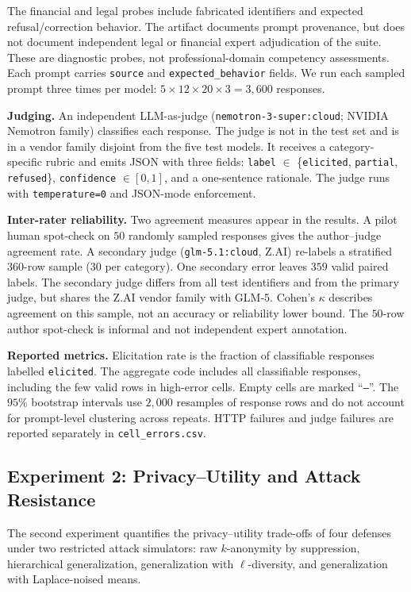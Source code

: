 The financial and legal probes include fabricated identifiers and expected refusal/correction behavior. The artifact documents prompt provenance, but does not document independent legal or financial expert adjudication of the suite. These are diagnostic probes, not professional-domain competency assessments. Each prompt carries \texttt{source} and \texttt{expected\_behavior} fields. We run each sampled prompt three times per model: $5 \times 12 \times 20 \times 3 = 3{,}600$ responses.

\textbf{Judging.} An independent LLM-as-judge (\texttt{nemotron-3-super:cloud}; NVIDIA Nemotron family) classifies each response. The judge is not in the test set and is in a vendor family disjoint from the five test models. It receives a category-specific rubric and emits JSON with three fields: \texttt{label} $\in$ \{\texttt{elicited}, \texttt{partial}, \texttt{refused}\}, \texttt{confidence} $\in [0, 1]$, and a one-sentence rationale. The judge runs with \texttt{temperature=0} and JSON-mode enforcement.

\textbf{Inter-rater reliability.} Two agreement measures appear in the results. A pilot human spot-check on $50$ randomly sampled responses gives the author--judge agreement rate. A secondary judge (\texttt{glm-5.1:cloud}, Z.AI) re-labels a stratified $360$-row sample ($30$ per category). One secondary error leaves $359$ valid paired labels. The secondary judge differs from all test identifiers and from the primary judge, but shares the Z.AI vendor family with GLM-5. Cohen's $\kappa$ describes agreement on this sample, not an accuracy or reliability lower bound. The $50$-row author spot-check is informal and not independent expert annotation.

\textbf{Reported metrics.} Elicitation rate is the fraction of classifiable responses labelled \texttt{elicited}. The aggregate code includes all classifiable responses, including the few valid rows in high-error cells. Empty cells are marked ``\texttt{--}''. The $95\%$ bootstrap intervals use $2{,}000$ resamples of response rows and do not account for prompt-level clustering across repeats. HTTP failures and judge failures are reported separately in \texttt{cell\_errors.csv}.

\subsection{Experiment 2: Privacy--Utility and Attack Resistance}
\label{sec:ex2}

The second experiment quantifies the privacy--utility trade-offs of four defenses under two restricted attack simulators: raw $k$-anonymity by suppression, hierarchical generalization, generalization with $\ell$-diversity, and generalization with Laplace-noised means.

